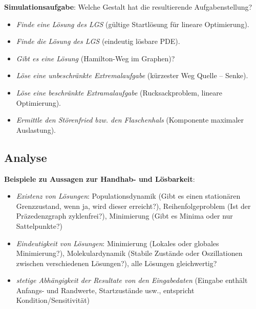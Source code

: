 \textbf{Simulationsaufgabe}:
Welche Gestalt hat die resultierende Aufgabenstellung?
\begin{itemize}
    \item
    \emph{Finde eine Lösung des LGS}
    (gültige Startlösung für lineare Optimierung).

    \item
    \emph{Finde die Lösung des LGS}
    (eindeutig lösbare PDE).

    \item
    \emph{Gibt es eine Lösung}
    (Hamilton-Weg im Graphen)?

    \item
    \emph{Löse eine unbeschränkte Extremalaufgabe}
    (kürzester Weg Quelle -- Senke).

    \item
    \emph{Löse eine beschränkte Extramalaufgabe}
    (Rucksackproblem, lineare Optimierung).

    \item
    \emph{Ermittle den Störenfried bzw. den Flaschenhals}
    (Komponente maximaler Auslastung).
\end{itemize}

\pagebreak

\subsection{%
    Analyse%
}

\textbf{Beispiele zu Aussagen zur Handhab- und Lösbarkeit}:
\begin{itemize}
    \item
    \emph{Existenz von Lösungen}:
    Populationsdynamik (Gibt es einen stationären Grenzzustand, wenn ja, wird dieser erreicht?),
    Reihenfolgeproblem (Ist der Präzedenzgraph zyklenfrei?),
    Minimierung (Gibt es Minima oder nur Sattelpunkte?)

    \item
    \emph{Eindeutigkeit von Lösungen}:
    Minimierung (Lokales oder globales Minimierung?),
    Molekulardynamik (Stabile Zustände oder Oszillationen zwischen verschiedenen Lösungen?),
    alle Lösungen gleichwertig?

    \item
    \emph{stetige Abhängigkeit der Resultate von den Eingabedaten}
    (Eingabe enthält Anfangs- und Randwerte, Startzustände usw.,
    entspricht Kondition/Sensitivität)
\end{itemize}

\linie

